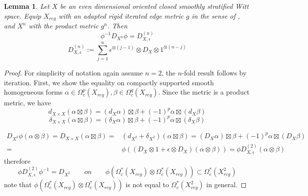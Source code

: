 \documentclass[11pt,leqno,twoside]{amsart}
\theoremstyle{plainsl}
\newtheorem{lemma}[theorem]{Lemma}
\theoremstyle{definition}
\begin{document}
\begin{lemma}
    Let $X$ be an even dimensional oriented closed smoothly stratified Witt space. Equip $X_{reg}$ with an {adapted rigid iterated edge metric} $g$ in the sense of \cite{ALMP}, and $X^n$ with the product metric $g^n$. Then
   \begin{equation}\label{intertwindeD}
       \phi^{-1} D_{X^n} \phi=D^{(n)}_{X,\epsilon}
   \end{equation}
        \begin{equation}\label{Dxepsilonn}
    D_{X,\epsilon}^{(n)}:=\sum_{j=1}^n
\epsilon^{\otimes(j-1)}
\otimes D_X \otimes 1^{\otimes(n-j)}
        \end{equation}
        \end{lemma}
\begin{proof}
For simplicity of notation  again assume $n=2$, the $n$-fold result follows by iteration.
First, we show the equality on  
 compactly supported smooth homogeneous forms $\alpha \in \Omega^{p}_{c}(X_{reg}), \beta \in \Omega^{q}_{c}(X_{reg})$.
  Since the metric is a product metric, we have
\[d_{X\times X}(\alpha\boxtimes\beta)=(d_X\alpha)\boxtimes\beta
+(-1)^p\alpha\boxtimes(d_X\beta)\]
\[\delta_{X\times X}(\alpha\boxtimes\beta)
=
(\delta_X\alpha)\boxtimes\beta
+
(-1)^p\alpha\boxtimes(\delta_X\beta)\]







  
\begin{align*}
     D_{X^2} \phi(\alpha {\otimes} \beta)=D_{X\times X}(\alpha\boxtimes\beta)=&(d_{X^2}+\delta_{X^2})(\alpha\boxtimes\beta)=(D_X\alpha)\boxtimes\beta
+
(-1)^p\alpha\boxtimes(D_X\beta)\\
=&\phi\left((D_X\otimes1 + \epsilon \otimes D_X)(\alpha {\otimes} \beta)\right)
=\phi D^{(2)}_{X,\epsilon}(\alpha \otimes \beta)
\end{align*}
therefore
\begin{equation}\label{eqinsidethm}
    \phi D^{(2)}_{X,\epsilon}  \phi^{-1}=D_{X^2} \qquad  on \qquad \phi(\Omega^*_{c}(X_{reg})\otimes \Omega^*_{c}(X_{reg})) \subset \Omega^*_{c}(X^2_{reg})
\end{equation}
note that $\phi(\Omega^*_{c}(X_{reg})\otimes \Omega^*_{c}(X_{reg}))$ 
 is not equal to $\Omega^*_{c}(X^2_{reg})$ in general.






\end{proof}
\end{document}
